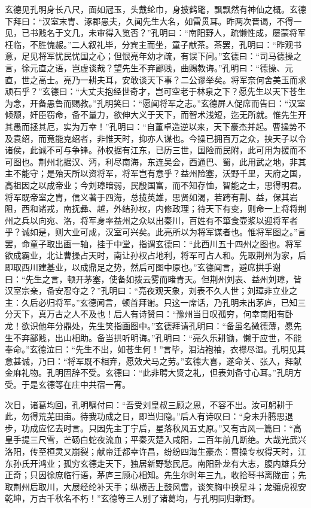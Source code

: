 玄德见孔明身长八尺，面如冠玉，头戴纶巾，身披鹤氅，飘飘然有神仙之概。玄德下拜曰：“汉室末胄、涿郡愚夫，久闻先生大名，如雷贯耳。昨两次晋谒，不得一见，已书贱名于文几，未审得入览否？”孔明曰：“南阳野人，疏懒性成，屡蒙将军枉临，不胜愧赧。”二人叙礼毕，分宾主而坐，童子献茶。茶罢，孔明曰：“昨观书意，足见将军忧民忧国之心；但恨亮年幼才疏，有误下问。”玄德曰：“司马德操之言，徐元直之语，岂虚谈哉？望先生不弃鄙贱，曲赐教诲。”孔明曰：“德操、元直，世之高士。亮乃一耕夫耳，安敢谈天下事？二公谬举矣。将军奈何舍美玉而求顽石乎？”玄德曰：“大丈夫抱经世奇才，岂可空老于林泉之下？愿先生以天下苍生为念，开备愚鲁而赐教。”孔明笑曰：“愿闻将军之志。”玄德屏人促席而告曰：“汉室倾颓，奸臣窃命，备不量力，欲伸大义于天下，而智术浅短，迄无所就。惟先生开其愚而拯其厄，实为万幸！”孔明曰：“自董卓造逆以来，天下豪杰并起。曹操势不及袁绍，而竟能克绍者，非惟天时，抑亦人谋也。今操已拥百万之众，挟天子以令诸侯，此诚不可与争锋。孙权据有江东，已历三世，国险而民附，此可用为援而不可图也。荆州北据汉、沔，利尽南海，东连吴会，西通巴、蜀，此用武之地，非其主不能守；是殆天所以资将军，将军岂有意乎？益州险塞，沃野千里，天府之国，高祖因之以成帝业；今刘璋暗弱，民殷国富，而不知存恤，智能之士，思得明君。将军既帝室之胄，信义著于四海，总揽英雄，思贤如渴，若跨有荆、益，保其岩阻，西和诸戎，南抚彝、越，外结孙权，内修政理；待天下有变，则命一上将将荆州之兵以向宛、洛，将军身率益州之众以出秦川，百姓有不箪食壶浆以迎将军者乎？诚如是，则大业可成，汉室可兴矣。此亮所以为将军谋者也。惟将军图之。”言罢，命童子取出画一轴，挂于中堂，指谓玄德曰：“此西川五十四州之图也。将军欲成霸业，北让曹操占天时，南让孙权占地利，将军可占人和。先取荆州为家，后即取西川建基业，以成鼎足之势，然后可图中原也。”玄德闻言，避席拱手谢曰：“先生之言，顿开茅塞，使备如拨云雾而睹青天。但荆州刘表、益州刘璋，皆汉室宗亲，备安忍夺之？”孔明曰：“亮夜观天象，刘表不久人世；刘璋非立业之主：久后必归将军。”玄德闻言，顿首拜谢。只这一席话，乃孔明未出茅庐，已知三分天下，真万古之人不及也！后人有诗赞曰：“豫州当日叹孤穷，何幸南阳有卧龙！欲识他年分鼎处，先生笑指画图中。”玄德拜请孔明曰：“备虽名微德薄，愿先生不弃鄙贱，出山相助。备当拱听明诲。”孔明曰：“亮久乐耕锄，懒于应世，不能奉命。”玄德泣曰：“先生不出，如苍生何！”言毕，泪沾袍袖，衣襟尽湿。孔明见其意甚诚，乃曰：“将军既不相弃，愿效犬马之劳。”玄德大喜，遂命关、张入，拜献金麻礼物。孔明固辞不受。玄德曰：“此非聘大贤之礼，但表刘备寸心耳。”孔明方受。于是玄德等在庄中共宿一宵。

次日，诸葛均回，孔明嘱付曰：“吾受刘皇叔三顾之恩，不容不出。汝可躬耕于此，勿得荒芜田亩。待我功成之日，即当归隐。”后人有诗叹曰：“身未升腾思退步，功成应忆去时言。只因先主丁宁后，星落秋风五丈原。”又有古风一篇曰：“高皇手提三尺雪，芒砀白蛇夜流血；平秦灭楚入咸阳，二百年前几断绝。大哉光武兴洛阳，传至桓灵又崩裂；献帝迁都幸许昌，纷纷四海生豪杰：曹操专权得天时，江东孙氏开鸿业；孤穷玄德走天下，独居新野愁民厄。南阳卧龙有大志，腹内雄兵分正奇；只因徐庶临行语，茅庐三顾心相知。先生尔时年三九，收拾琴书离陇亩；先取荆州后取川，大展经纶补天手；纵横舌上鼓风雷，谈笑胸中换星斗；龙骧虎视安乾坤，万古千秋名不朽！”玄德等三人别了诸葛均，与孔明同归新野。

